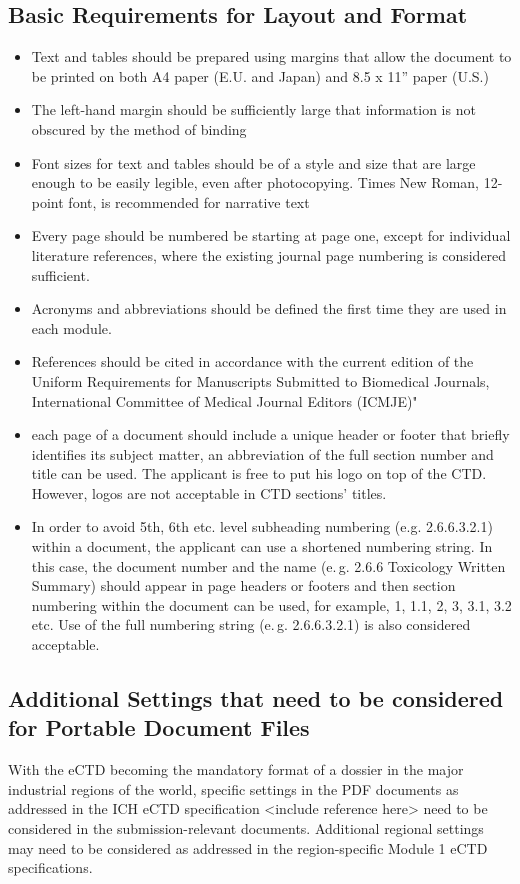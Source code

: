 \documentclass{pharmrep}
\newcommand{\eg}{e.\,g.\xspace}
\begin{document}
\subsection{Basic Requirements for Layout and Format}
\begin{itemize}
\item Text and tables should be prepared using margins that allow the document to be printed on
both A4 paper (E.U. and Japan) and 8.5 x 11” paper (U.S.)
\item The left-hand margin should be sufficiently large that information is not obscured by the
method of binding
\item Font sizes for text and tables should be of a style and size that are large enough to be easily
legible, even after photocopying. Times New Roman, 12-point font, is recommended for narrative text
\item Every page should be numbered be starting at page one, except for individual literature
references, where the existing journal page numbering is considered sufficient.
\item Acronyms and abbreviations should be defined the first time they are used in each module.
\item References should be cited in accordance with the current edition of the Uniform
Requirements
for Manuscripts Submitted to Biomedical Journals, International Committee of Medical Journal Editors
(ICMJE)"
\item each page of a document should include a unique header or footer that briefly identifies its
subject matter, an abbreviation of the full section number and title can be used. The applicant is free to
put his logo on top of the CTD. However, logos are not acceptable in CTD sections' titles.
\item In order to avoid 5th, 6th etc. level subheading numbering (e.g. 2.6.6.3.2.1) within a document,
the applicant can use a shortened numbering string. In this case, the document number and the name
(\eg 2.6.6 Toxicology Written Summary) should appear in page headers or footers and then section
numbering within the document can be used, for example, 1, 1.1, 2, 3, 3.1, 3.2 etc. Use of the full numbering string
(\eg 2.6.6.3.2.1) is also considered acceptable.
\end{itemize}

\subsection{Additional Settings that need to be considered for Portable Document Files}
With the eCTD becoming the mandatory format of a dossier in the major industrial regions of the world,
specific settings in the PDF documents as addressed in the ICH eCTD specification <include reference
here>
need to be considered in the submission-relevant documents. Additional regional settings may need to
be
considered as addressed in the region-specific Module 1 eCTD specifications.
\end{document}
